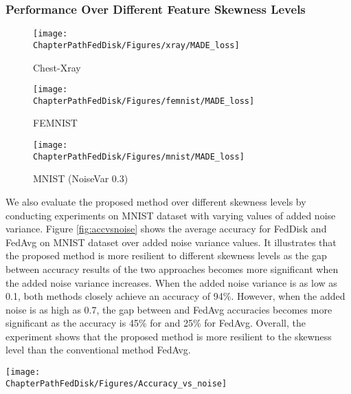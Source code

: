 \subsubsection{Performance Over Different Feature Skewness Levels}
\begin{figure*}[ht!]
	\centering
	\begin{subfigure}[t]{0.3\linewidth}	
		\texttt{[image: \\ChapterPathFedDisk/Figures/xray/MADE\_loss]}
		\caption{Chest-Xray }
		\label{fig:made_loss_xray}
	\end{subfigure}
	\hspace{0.01em}%
	\begin{subfigure}[t]{0.3\linewidth}
		\texttt{[image: \\ChapterPathFedDisk/Figures/femnist/MADE\_loss]}
		\caption{FEMNIST}
		\label{fig:made_loss_femnist}
	\end{subfigure}
	\hspace{0.01em}%
	\begin{subfigure}[t]{0.3\linewidth}	
		\texttt{[image: \\ChapterPathFedDisk/Figures/mnist/MADE\_loss]}
		\caption{MNIST (NoiseVar 0.3)  }
		\label{fig:made_loss_mnist}
	\end{subfigure}
	\caption[Validation and training loss over gloabl iterations.]{Average validation and train losses during training the global MADE models. The training processes were stopped if the validation loss starts increasing. }
	\label{fig:made_loss}
\end{figure*}
We also evaluate the proposed method over different skewness levels by conducting experiments on MNIST dataset with varying values of added noise variance. Figure \ref{fig:accvsnoise} shows the average accuracy for FedDisk and FedAvg on MNIST dataset over added noise variance values. It illustrates that the proposed method is more resilient to different skewness levels as the gap between accuracy results of the two approaches becomes more significant when the added noise variance increases. When the added noise variance is as low as 0.1, both methods closely achieve an accuracy of 94\%. However, when the added noise is as high as 0.7, the gap between \MethodnameShort{} and FedAvg accuracies becomes more significant as the accuracy is 45\% for \MethodnameShort{} and 25\% for FedAvg. Overall, the experiment shows that the proposed method is more resilient to the skewness level than the conventional method FedAvg.
\begin{figure*}[ht!]
	\centering
	\texttt{[image: \\ChapterPathFedDisk/Figures/Accuracy\_vs\_noise]}
	\caption[Accuracy over different noise levels.]{FedDisk and FedAvg accuracy on different added noise variance.}	
	\label{fig:accvsnoise}
\end{figure*}

